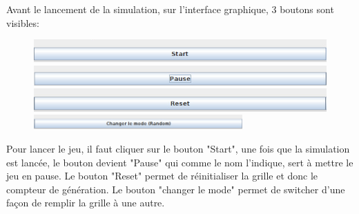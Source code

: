     Avant le lancement de la simulation, sur l'interface graphique, 3 boutons sont visibles:

\begin{figure}

\begin{center}
    \includegraphics[width=120mm,scale=0.5]{figures/start_btn.png}
    
    \includegraphics[width=120mm,scale=0.5]{figures/pause_btn.png}
    
    \includegraphics[width=120mm,scale=0.5]{figures/reset_btn.png}
    
    \includegraphics[width=80mm,scale=0.5]{figures/change_btn.png}
\end{center}

\end{figure}

Pour lancer le jeu, il faut cliquer sur le bouton "Start", une fois que la simulation est lancée, le bouton devient "Pause" qui comme le nom l'indique, sert à mettre le jeu en pause.
Le bouton "Reset" permet de réinitialiser la grille et donc le compteur de génération. 
Le bouton "changer le mode" permet de switcher d'une façon de remplir la grille à une autre.

